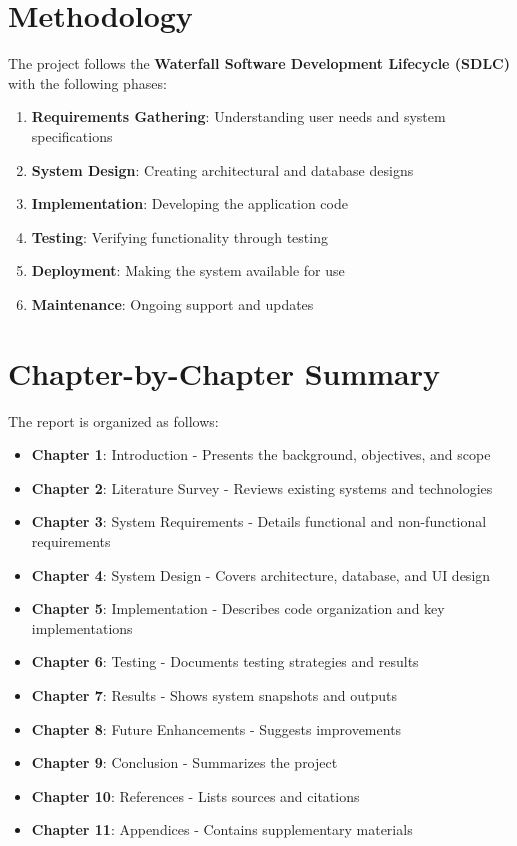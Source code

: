 \documentclass[12pt,a4paper,twoside]{book}
\begin{document}
\section{Methodology}

The project follows the \textbf{Waterfall Software Development Lifecycle (SDLC)} with the following phases:

\begin{enumerate}
    \item \textbf{Requirements Gathering}: Understanding user needs and system specifications
    \item \textbf{System Design}: Creating architectural and database designs
    \item \textbf{Implementation}: Developing the application code
    \item \textbf{Testing}: Verifying functionality through testing
    \item \textbf{Deployment}: Making the system available for use
    \item \textbf{Maintenance}: Ongoing support and updates
\end{enumerate}

\section{Chapter-by-Chapter Summary}

The report is organized as follows:

\begin{itemize}
    \item \textbf{Chapter 1}: Introduction - Presents the background, objectives, and scope
    \item \textbf{Chapter 2}: Literature Survey - Reviews existing systems and technologies
    \item \textbf{Chapter 3}: System Requirements - Details functional and non-functional requirements
    \item \textbf{Chapter 4}: System Design - Covers architecture, database, and UI design
    \item \textbf{Chapter 5}: Implementation - Describes code organization and key implementations
    \item \textbf{Chapter 6}: Testing - Documents testing strategies and results
    \item \textbf{Chapter 7}: Results - Shows system snapshots and outputs
    \item \textbf{Chapter 8}: Future Enhancements - Suggests improvements
    \item \textbf{Chapter 9}: Conclusion - Summarizes the project
    \item \textbf{Chapter 10}: References - Lists sources and citations
    \item \textbf{Chapter 11}: Appendices - Contains supplementary materials
\end{itemize}
\end{document}

